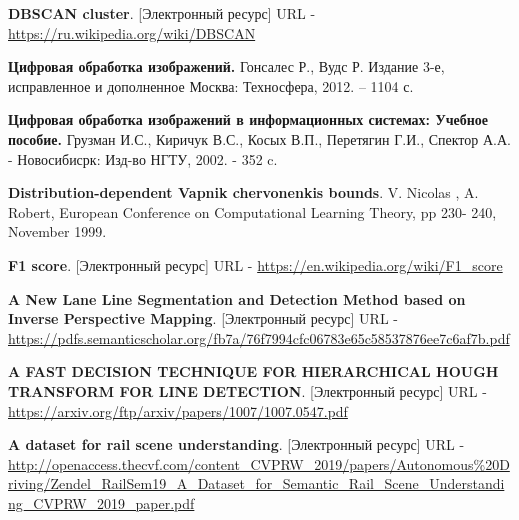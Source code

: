 \begin{thebibliography}{2}
	\textbf{DBSCAN cluster}. [Электронный ресурс] URL - 
	\href{https://ru.wikipedia.org/wiki/DBSCAN}{https://ru.wikipedia.org/wiki/DBSCAN}
	
	\textbf{Цифровая обработка изображений.}
	Гонсалес Р., Вудс Р.
	Издание 3-е, исправленное и дополненное
	Москва: Техносфера, 2012. – 1104 с. 
	
		\textbf{Цифровая обработка изображений в информационных системах: Учебное пособие.} Грузман И.С., Киричук В.С., Косых В.П., Перетягин Г.И., Спектор А.А. - Новосибисрк: Изд-во НГТУ, 2002. - 352 c.
	
	\textbf{Distribution-dependent Vapnik chervonenkis
		bounds}. V. Nicolas , A. Robert, European Conference on Computational Learning Theory, pp 230-
	240, November 1999.
	
	\textbf{F1 score}. [Электронный ресурс] URL - 
	\href{https://en.wikipedia.org/wiki/F1_score}{https://en.wikipedia.org/wiki/F1\_score}
	
	\textbf{A New Lane Line Segmentation and Detection Method based on Inverse
		Perspective Mapping}. [Электронный ресурс] URL - 
	\href{https://pdfs.semanticscholar.org/fb7a/76f7994cfc06783e65c58537876ee7c6af7b.pdf}{https://pdfs.semanticscholar.org/fb7a/76f7994cfc06783e65c58537876ee7c6af7b.pdf}
	
	\textbf{A FAST DECISION TECHNIQUE FOR HIERARCHICAL HOUGH
		TRANSFORM FOR LINE DETECTION}. [Электронный ресурс] URL - 
	\href{https://arxiv.org/ftp/arxiv/papers/1007/1007.0547.pdf}{https://arxiv.org/ftp/arxiv/papers/1007/1007.0547.pdf}
	
	\textbf{A dataset for rail scene understanding}. [Электронный ресурс] URL - 
	\href{http://openaccess.thecvf.com/content_CVPRW_2019/papers/Autonomous\%20Driving/Zendel_RailSem19_A_Dataset_for_Semantic_Rail_Scene_Understanding_CVPRW_2019_paper.pdf}{http://openaccess.thecvf.com/content\_CVPRW\_2019/papers/Autonomous\%20Driving/Zendel\_RailSem19\_A\_Dataset\_for\_Semantic\_Rail\_Scene\_Understanding\_CVPRW\_2019\_paper.pdf}
	
\end{thebibliography}		  		 		
